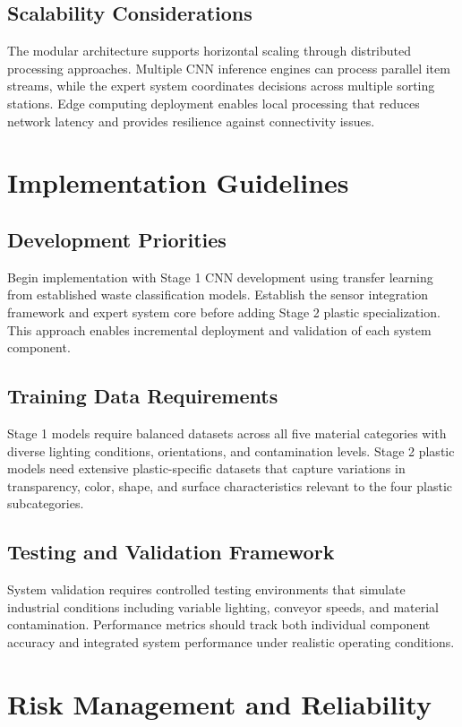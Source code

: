 \documentclass[11pt, a4paper]{article}
\begin{document}
\subsection{Scalability Considerations}
The modular architecture supports horizontal scaling through distributed processing approaches. Multiple CNN inference engines can process parallel item streams, while the expert system coordinates decisions across multiple sorting stations. Edge computing deployment enables local processing that reduces network latency and provides resilience against connectivity issues.

\section{Implementation Guidelines}

\subsection{Development Priorities}
Begin implementation with Stage 1 CNN development using transfer learning from established waste classification models. Establish the sensor integration framework and expert system core before adding Stage 2 plastic specialization. This approach enables incremental deployment and validation of each system component.

\subsection{Training Data Requirements}
Stage 1 models require balanced datasets across all five material categories with diverse lighting conditions, orientations, and contamination levels. Stage 2 plastic models need extensive plastic-specific datasets that capture variations in transparency, color, shape, and surface characteristics relevant to the four plastic subcategories.

\subsection{Testing and Validation Framework}
System validation requires controlled testing environments that simulate industrial conditions including variable lighting, conveyor speeds, and material contamination. Performance metrics should track both individual component accuracy and integrated system performance under realistic operating conditions.

\section{Risk Management and Reliability}
\end{document}
